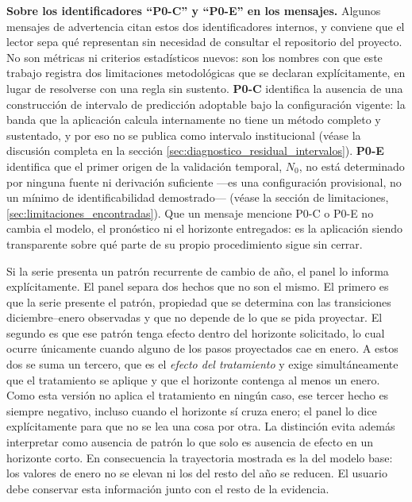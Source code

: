 \documentclass[12pt,letterpaper]{article}
\begin{document}
\textbf{Sobre los identificadores ``P0-C'' y ``P0-E'' en los mensajes.} Algunos mensajes de advertencia citan estos dos identificadores internos, y conviene que el lector sepa qué representan sin necesidad de consultar el repositorio del proyecto. No son métricas ni criterios estadísticos nuevos: son los nombres con que este trabajo registra dos limitaciones metodológicas que se declaran explícitamente, en lugar de resolverse con una regla sin sustento. \textbf{P0-C} identifica la ausencia de una construcción de intervalo de predicción adoptable bajo la configuración vigente: la banda que la aplicación calcula internamente no tiene un método completo y sustentado, y por eso no se publica como intervalo institucional (véase la discusión completa en la sección \ref{sec:diagnostico_residual_intervalos}). \textbf{P0-E} identifica que el primer origen de la validación temporal, \(N_0\), no está determinado por ninguna fuente ni derivación suficiente —es una configuración provisional, no un mínimo de identificabilidad demostrado— (véase la sección de limitaciones, \ref{sec:limitaciones_encontradas}). Que un mensaje mencione P0-C o P0-E no cambia el modelo, el pronóstico ni el horizonte entregados: es la aplicación siendo transparente sobre qué parte de su propio procedimiento sigue sin cerrar.

Si la serie presenta un patrón recurrente de cambio de año, el panel lo informa explícitamente. El panel separa dos hechos que no son el mismo. El primero es que la serie presente el patrón, propiedad que se determina con las transiciones diciembre--enero observadas y que no depende de lo que se pida proyectar. El segundo es que ese patrón tenga efecto dentro del horizonte solicitado, lo cual ocurre únicamente cuando alguno de los pasos proyectados cae en enero. A estos dos se suma un tercero, que es el \emph{efecto del tratamiento} y exige simultáneamente que el tratamiento se aplique y que el horizonte contenga al menos un enero. Como esta versión no aplica el tratamiento en ningún caso, ese tercer hecho es siempre negativo, incluso cuando el horizonte sí cruza enero; el panel lo dice explícitamente para que no se lea una cosa por otra. La distinción evita además interpretar como ausencia de patrón lo que solo es ausencia de efecto en un horizonte corto. En consecuencia la trayectoria mostrada es la del modelo base: los valores de enero no se elevan ni los del resto del año se reducen. El usuario debe conservar esta información junto con el resto de la evidencia.
\end{document}
